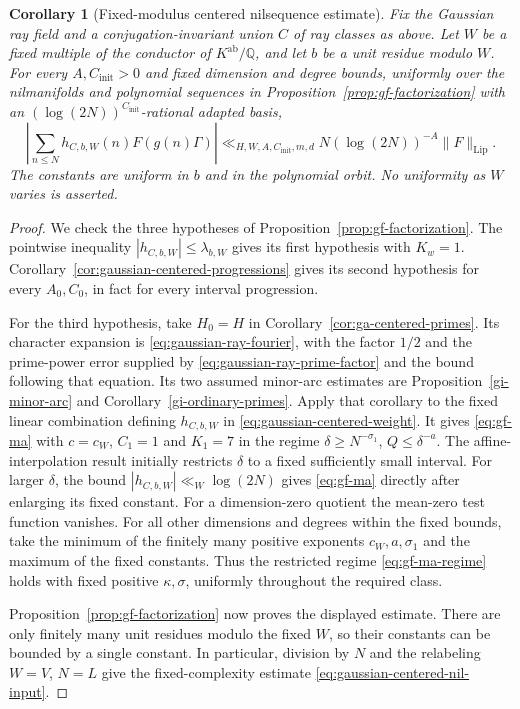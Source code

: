 \documentclass[11pt]{article}
\newtheorem{corollary}[theorem]{Corollary}
\theoremstyle{definition}
\theoremstyle{remark}
\newcommand{\Q}{\mathbb Q}
\begin{document}
\begin{corollary}[Fixed-modulus centered nilsequence estimate]
\label{cor:ga-fixed-centered-nilsequence}
Fix the Gaussian ray field and a conjugation-invariant union $C$ of ray
classes as above. Let $W$ be a fixed multiple of the conductor of
$K^{\mathrm{ab}}/\Q$, and let $b$ be a unit residue modulo $W$.
For every $A,C_{\mathrm{init}}>0$ and fixed dimension and degree bounds,
uniformly over the nilmanifolds and polynomial sequences in
Proposition~\ref{prop:gf-factorization} with an
$(\log(2N))^{C_{\mathrm{init}}}$-rational adapted basis,
\[
 \left|\sum_{n\leq N}h_{C,b,W}(n)F(g(n)\Gamma)\right|
 \ll_{H,W,A,C_{\mathrm{init}},m,d}
 N(\log(2N))^{-A}\|F\|_{\mathrm{Lip}}.
\]
The constants are uniform in $b$ and in the polynomial orbit. No
uniformity as $W$ varies is asserted.
\end{corollary}
\begin{proof}
We check the three hypotheses of
Proposition~\ref{prop:gf-factorization}. The pointwise inequality
$|h_{C,b,W}|\leq\lambda_{b,W}$ gives its first hypothesis with $K_w=1$.
Corollary~\ref{cor:gaussian-centered-progressions} gives its second
hypothesis for every $A_0,C_0$, in fact for every interval progression.

For the third hypothesis, take $H_0=H$ in
Corollary~\ref{cor:ga-centered-primes}. Its character expansion is
\eqref{eq:gaussian-ray-fourier}, with the factor $1/2$ and the
prime-power error supplied by \eqref{eq:gaussian-ray-prime-factor}
and the bound following that equation. Its two assumed minor-arc
estimates are Proposition~\ref{gi-minor-arc} and
Corollary~\ref{gi-ordinary-primes}. Apply that corollary to the fixed
linear combination defining $h_{C,b,W}$ in
\eqref{eq:gaussian-centered-weight}. It gives \eqref{eq:gf-ma} with
$c=c_W$, $C_1=1$ and $K_1=7$ in the regime
$\delta\geq N^{-\sigma_1}$, $Q\leq\delta^{-a}$.
The affine-interpolation result initially restricts $\delta$ to a
fixed sufficiently small interval. For larger $\delta$, the bound
$|h_{C,b,W}|\ll_W\log(2N)$ gives \eqref{eq:gf-ma} directly after
enlarging its fixed constant. For a dimension-zero quotient the
mean-zero test function vanishes. For all other dimensions and degrees
within the fixed bounds, take the minimum of the finitely many positive
exponents $c_W,a,\sigma_1$ and the maximum of the fixed constants.
Thus the restricted regime \eqref{eq:gf-ma-regime} holds with fixed
positive $\kappa,\sigma$, uniformly throughout the required class.

Proposition~\ref{prop:gf-factorization} now proves the displayed
estimate. There are only finitely many unit residues modulo the fixed
$W$, so their constants can be bounded by a single constant. In
particular, division by $N$ and the relabeling $W=V$, $N=L$ give the
fixed-complexity estimate \eqref{eq:gaussian-centered-nil-input}.
\end{proof}
\end{document}
